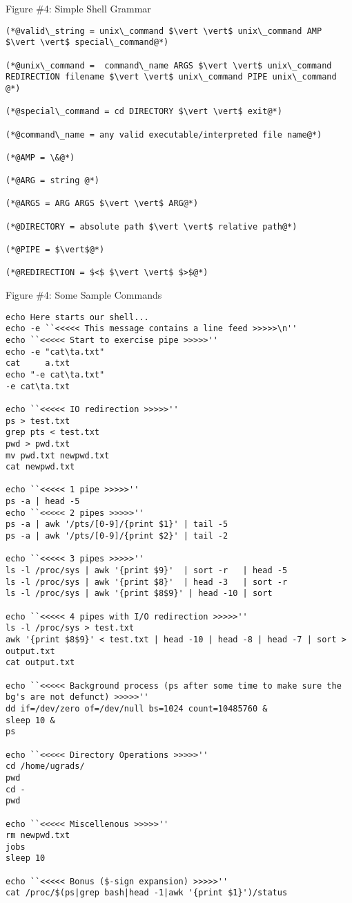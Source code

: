 \documentclass[12pt]{article}
\begin{document}
\begin{center}
    Figure \#4: Simple Shell Grammar
\end{center}
\begin{lstlisting}[frame=single]
(*@valid\_string = unix\_command $\vert \vert$ unix\_command AMP $\vert \vert$ special\_command@*)

(*@unix\_command =  command\_name ARGS $\vert \vert$ unix\_command REDIRECTION filename $\vert \vert$ unix\_command PIPE unix\_command @*)

(*@special\_command = cd DIRECTORY $\vert \vert$ exit@*)

(*@command\_name = any valid executable/interpreted file name@*)

(*@AMP = \&@*)

(*@ARG = string @*)

(*@ARGS = ARG ARGS $\vert \vert$ ARG@*)

(*@DIRECTORY = absolute path $\vert \vert$ relative path@*)

(*@PIPE = $\vert$@*)

(*@REDIRECTION = $<$ $\vert \vert$ $>$@*)
\end{lstlisting}


\begin{center}
    Figure \#4: Some Sample Commands
\end{center}
\begin{lstlisting}[frame=single]
echo Here starts our shell...
echo -e ``<<<<< This message contains a line feed >>>>>\n''
echo ``<<<<< Start to exercise pipe >>>>>''
echo -e "cat\ta.txt"
cat     a.txt
echo "-e cat\ta.txt"
-e cat\ta.txt

echo ``<<<<< IO redirection >>>>>''
ps > test.txt
grep pts < test.txt
pwd > pwd.txt
mv pwd.txt newpwd.txt
cat newpwd.txt

echo ``<<<<< 1 pipe >>>>>''
ps -a | head -5
echo ``<<<<< 2 pipes >>>>>''
ps -a | awk '/pts/[0-9]/{print $1}' | tail -5
ps -a | awk '/pts/[0-9]/{print $2}' | tail -2

echo ``<<<<< 3 pipes >>>>>''
ls -l /proc/sys | awk '{print $9}' 	| sort -r 	| head -5
ls -l /proc/sys | awk '{print $8}' 	| head -3 	| sort -r
ls -l /proc/sys | awk '{print $8$9}' | head -10 | sort

echo ``<<<<< 4 pipes with I/O redirection >>>>>''
ls -l /proc/sys > test.txt
awk '{print $8$9}' < test.txt | head -10 | head -8 | head -7 | sort > output.txt
cat output.txt

echo ``<<<<< Background process (ps after some time to make sure the bg's are not defunct) >>>>>''
dd if=/dev/zero of=/dev/null bs=1024 count=10485760 &
sleep 10 &
ps

echo ``<<<<< Directory Operations >>>>>''
cd /home/ugrads/
pwd
cd -
pwd

echo ``<<<<< Miscellenous >>>>>''
rm newpwd.txt
jobs
sleep 10

echo ``<<<<< Bonus ($-sign expansion) >>>>>''
cat /proc/$(ps|grep bash|head -1|awk '{print $1}')/status

\end{lstlisting}
\end{document}
